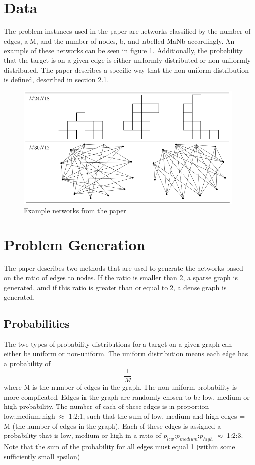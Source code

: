 \documentclass{article}
\begin{document}
\section{Data}
The problem instances used in the paper are networks classified by the number of edges, a M, and the number of nodes, b, and labelled MaNb accordingly. An example of these networks can be seen in figure \ref{fig:netExamples}. Additionally, the probability that the target is on a given edge is either uniformly distributed or non-uniformly distributed. The paper describes a specific way that the non-uniform distribution is defined, described in section \ref{Prob}.
\begin{figure}[h]
    \includegraphics[width=\textwidth]{networkExamples}
    \caption{Example networks from the paper}
    \label{fig:netExamples}
\end{figure}

\section{Problem Generation}
The paper describes two methods that are used to generate the networks based on the ratio of edges to nodes. If the ratio is smaller than 2, a sparse graph is generated, amd if this ratio is greater than or equal to 2, a dense graph is generated.
\subsection{Probabilities} \label{Prob}
The two types of probability distributions for a target on a given graph can either be uniform or non-uniform. The uniform distribution means each edge has a probability of \[\frac{1}{M}\] where M is the number of edges in the graph.
The non-uniform probability is more complicated. Edges in the graph are randomly chosen to be low, medium or high probability. The number of each of these edges is in proportion low:medium:high $\approx$ 1:2:1, such that the sum of low, medium and high edges = M (the number of edges in the graph). Each of these edges is assigned a probability that is low, medium or high in a ratio of $p_{low}$:$p_{medium}$:$p_{high}$ $\approx$ 1:2:3. Note that the sum of the probability for all edges must equal 1 (within some sufficiently small epsilon)
\end{document}

